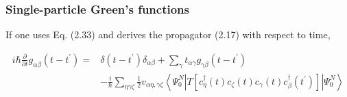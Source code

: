 \documentclass[compress]{beamer}
\begin{document}
\frame
{
\frametitle{Single-particle Green's functions}
\begin{small}
{\scriptsize
If one uses Eq. (2.33) and derives the propagator (2.17) with respect to time,

$$
\begin{aligned}
i \hbar \frac{\partial}{\partial t} g_{\alpha \beta}\left(t-t^{\prime}\right)= & \delta\left(t-t^{\prime}\right) \delta_{\alpha \beta}+\sum_{\gamma} t_{\alpha \gamma} g_{\gamma \beta}\left(t-t^{\prime}\right) \\
& -\frac{i}{\hbar} \sum_{\eta \gamma \zeta} \frac{1}{2} v_{\alpha \eta, \gamma \zeta}\left\langle\Psi_{0}^{N}\left|T\left[c_{\eta}^{\dagger}(t) c_{\zeta}(t) c_{\gamma}(t) c_{\beta}^{\dagger}\left(t^{\prime}\right)\right]\right| \Psi_{0}^{N}\right\rangle
\end{aligned}
$$

}
\end{small}
}
\end{document}
